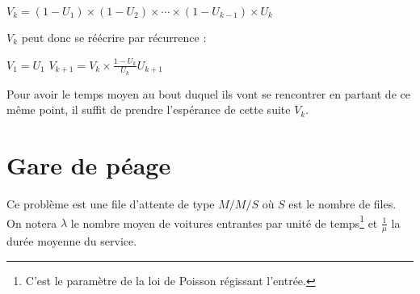 \documentclass{scrartcl}
\begin{document}
      $V_k = (1 - U_1) \times (1 - U_2) \times \cdots \times (1 - U_{k - 1})
      \times U_k$

      $V_k$ peut donc se réécrire par récurrence :

      $V_1 = U_1$ $V_{k + 1} = V_k \times \frac{1 - U_k}{U_k}U_{k + 1}$

      Pour avoir le temps moyen au bout duquel ils vont se rencontrer en
      partant de ce même point, il suffit de prendre l'espérance de cette suite
      $V_k$.

\section{Gare de péage}
  Ce problème est une file d'attente de type $M/M/S$ où $S$ est le nombre de
  files. On notera $\lambda$ le nombre moyen de voitures entrantes par unité de
  temps\footnote{C'est le paramètre de la loi de Poisson régissant l'entrée.}
  et $\frac 1 \mu$ la durée moyenne du service.
\end{document}

